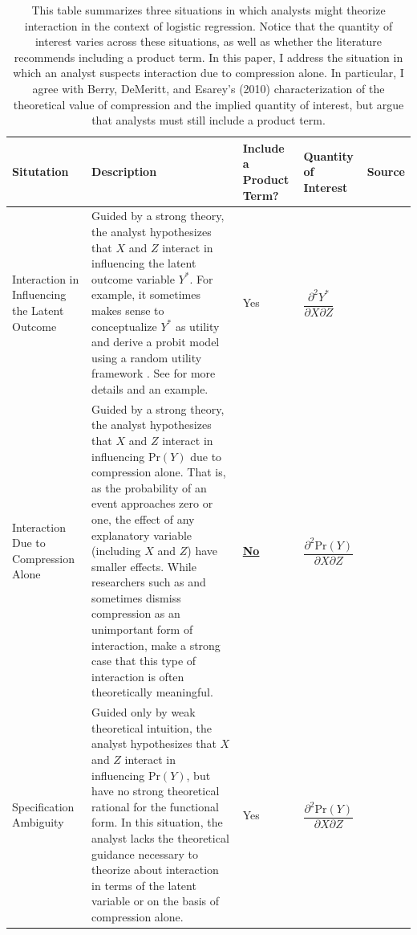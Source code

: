 \documentclass[12pt]{article}
\begin{document}
\renewcommand{\arraystretch}{1.5}
\begin{table}
\begin{center}
\begin{scriptsize}
\begin{tabular}{|>{\centering\arraybackslash}m{1in}m{2in}>{\centering\arraybackslash}m{.7in}>{\centering\arraybackslash}m{.5in}>{\centering\arraybackslash}
m{1.2in}|}
\hline

Situtation &
\begin{center}
Description
\end{center} & Include a Product Term? & Quantity of Interest & Source\\ 
\hline
Interaction in Influencing the Latent Outcome & Guided by a strong theory, the analyst hypothesizes that $X$ and $Z$ interact in influencing the latent outcome variable $Y^*$. For example, it sometimes makes sense to conceptualize $Y^*$ as utility and derive a probit model using a random utility framework \citep{Train2009}. See \citet[esp.pp. 261-262]{BerryDeMerittEsarey2010} for more details and an example. & Yes & $\dfrac{\partial^2 Y^*}{\partial X \partial Z}$ & \cite{Nagler1991}\\ 
Interaction Due to Compression Alone & Guided by a strong theory, the analyst hypothesizes that $X$ and $Z$ interact in influencing $\text{Pr}(Y)$ due to compression alone. That is, as the probability of an event approaches zero or one, the effect of any explanatory variable (including $X$ and $Z$) have smaller effects. While researchers such as \cite{Frant1991} and \cite{Nagler1991} sometimes dismiss compression as an unimportant form of interaction, \cite{BerryDeMerittEsarey2010} make a strong case that this type of interaction is often theoretically meaningful. & \underline{\textbf{No}} & $\dfrac{\partial^2 \text{Pr}(Y)}{\partial X \partial Z}$ & \cite{BerryDeMerittEsarey2010}\\ 
Specification Ambiguity & Guided only by weak theoretical intuition, the analyst hypothesizes that $X$ and $Z$ interact in influencing $\text{Pr}(Y)$, but have no strong theoretical rational for the functional form. In this situation, the analyst lacks the theoretical guidance necessary to theorize about interaction in terms of the latent variable or on the basis of compression alone.  & Yes & $\dfrac{\partial^2 \text{Pr}(Y)}{\partial X \partial Z}$& \cite{BerryDeMerittEsarey2014} \\ 
\hline
\end{tabular}\caption{This table summarizes three situations in which analysts might theorize interaction in the context of logistic regression. Notice that the quantity of interest varies across these situations, as well as whether the literature recommends including a product term. In this paper, I address the situation in which an analyst suspects interaction due to compression alone. In particular, I agree with Berry, DeMeritt, and Esarey's (2010) characterization of the theoretical value of compression and the implied quantity of interest, but argue that analysts must still include a product term.}\label{tab:lit}
\end{scriptsize}
\end{center}
\end{table}
\end{document}
